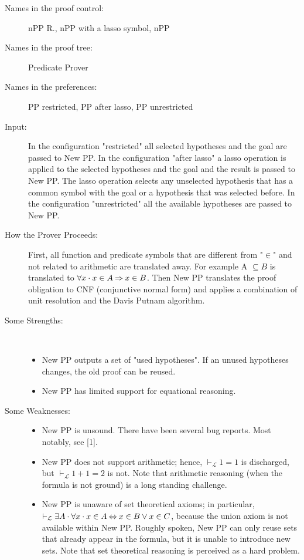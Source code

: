 \begin{description}
	\item[Names in the proof control:] nPP R., nPP with a lasso symbol, nPP
	\item[Names in the proof tree:] Predicate Prover
	\item[Names in the preferences:] PP restricted, PP after lasso, PP unrestricted
	\item[Input:] In the configuration "restricted" all selected hypotheses and the goal are passed to New PP. In the configuration "after lasso" a lasso operation is applied to the selected hypotheses and the goal and the result is passed to New PP. The lasso operation selects any unselected hypothesis that has a common symbol with the goal or a hypothesis that was selected before. In the configuration "unrestricted" all the available hypotheses are passed to New PP.
	\item[How the Prover Proceeds:] First, all function and predicate symbols that are different from "$\in$" and not related to arithmetic are translated away. For example A $\subseteq B$ is translated to $\forall x\cdot x \in A \mathbin\Rightarrow x \in B$. Then New PP translates the proof obligation to CNF (conjunctive normal form) and applies a combination of unit resolution and the Davis Putnam algorithm.
	\item[Some Strengths:] ~
	\begin{itemize}
		\item New PP outputs a set of "used hypotheses". If an unused hypotheses changes, the old proof can be reused.
		\item New PP has limited support for equational reasoning. 
	\end{itemize}
	\item[Some Weaknesses:]
	\begin{itemize} ~
		\item New PP is unsound. There have been several bug reports. Most notably, see [1].
		\item New PP does not support arithmetic; hence, $\vdash_{\mathcal L} 1=1$ is discharged, but $\vdash_{\mathcal L} 1+1=2$ is not. Note that arithmetic 	reasoning (when the formula is not ground) is a long standing challenge.
		\item New PP is unaware of set theoretical axioms; in particular, $\vdash_{\mathcal L} \exists A\cdot \forall x\cdot x \in A \mathbin\Leftrightarrow x \in B \lor x \in C$, because the union axiom is not available within New PP. Roughly spoken, New PP can only reuse sets that already appear in the formula, but it is unable to introduce new sets. Note that set theoretical reasoning is perceived as a hard problem.

\end{itemize}
\end{description}
